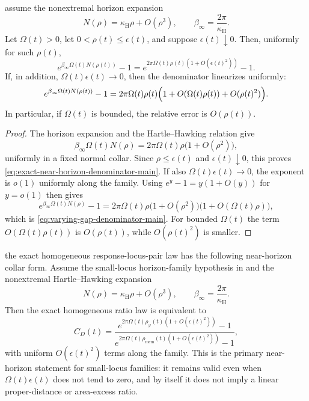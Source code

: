 \begin{lemma}\label{lem:varying-gap-denominator-main}
\ModelAClause assume the nonextremal horizon expansion
\[
N(\rho)=\kappa_{\mathrm H}\rho+O(\rho^3),
\qquad
\beta_\infty=\frac{2\pi}{\kappa_{\mathrm H}}.
\]
Let $\Omega(t)>0$, let $0<\rho(t)\le\epsilon(t)$, and suppose
$\epsilon(t)\downarrow0$. Then, uniformly for such $\rho(t)$,
\begin{equation}\label{eq:exact-near-horizon-denominator-main}
e^{\beta_\infty\Omega(t)N(\rho(t))}-1
=
e^{2\pi\Omega(t)\rho(t)(1+O(\epsilon(t)^2))}-1 .
\end{equation}
If, in addition, $\Omega(t)\epsilon(t)\to0$, then the denominator linearizes
uniformly:
\begin{equation}\label{eq:varying-gap-denominator-main}
e^{\beta_\infty\Omega(t)N(\rho(t))}-1
=2\pi\Omega(t)\rho(t)
\Bigl(1+O(\Omega(t)\rho(t))+O(\rho(t)^2)\Bigr).
\end{equation}
In particular, if $\Omega(t)$ is bounded, the relative error is $O(\rho(t))$.
\end{lemma}

\begin{proof}
The horizon expansion and the Hartle--Hawking relation give
\[
\beta_\infty\Omega(t)N(\rho)
=2\pi\Omega(t)\rho\bigl(1+O(\rho^2)\bigr),
\]
uniformly in a fixed normal collar. Since $\rho\le\epsilon(t)$ and
$\epsilon(t)\downarrow0$, this proves
\eqref{eq:exact-near-horizon-denominator-main}. If also
$\Omega(t)\epsilon(t)\to0$, the exponent is $o(1)$ uniformly along the family.
Using $e^y-1=y(1+O(y))$ for $y=o(1)$ then gives
\[
e^{\beta_\infty\Omega(t)N(\rho)}-1
=2\pi\Omega(t)\rho
\bigl(1+O(\rho^2)\bigr)
\bigl(1+O(\Omega(t)\rho)\bigr),
\]
which is \eqref{eq:varying-gap-denominator-main}. For bounded $\Omega(t)$ the
term $O(\Omega(t)\rho(t))$ is $O(\rho(t))$, while
$O(\rho(t)^2)$ is smaller.
\end{proof}

\begin{lemma}\label{lem:exact-collar-ratio-main}
\ModelAClause the exact homogeneous
response-locus-pair law has the following near-horizon collar form.
Assume the small-locus
horizon-family hypothesis in  and the nonextremal
Hartle--Hawking expansion
\[
N(\rho)=\kappa_{\mathrm H}\rho+O(\rho^3),
\qquad
\beta_\infty=\frac{2\pi}{\kappa_{\mathrm H}}.
\]
Then the exact homogeneous ratio law is equivalent to
\begin{equation}\label{eq:exact-collar-ratio-main}
C_D(t)=
\frac{
e^{2\pi\Omega(t)\rho_\varphi(t)(1+O(\epsilon(t)^2))}-1}
{
e^{2\pi\Omega(t)\rho_{\mathrm{mem}}(t)(1+O(\epsilon(t)^2))}-1},
\end{equation}
with uniform $O(\epsilon(t)^2)$ terms along the family. This is the primary
near-horizon statement for small-locus families: it remains valid even when
$\Omega(t)\epsilon(t)$ does not tend to zero, and by itself it does not imply a
linear proper-distance or area-excess ratio.
\end{lemma}

